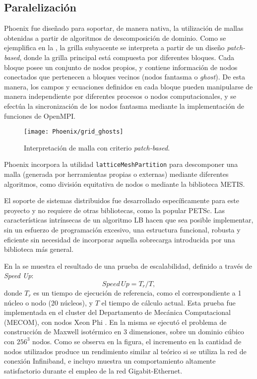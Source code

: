 \subsection{Paralelizaci\'on}

Phoenix fue dise\~nado para soportar, de manera nativa, la utilizaci\'on de mallas obtenidas a partir de algoritmos de descomposici\'on de dominio. Como se ejemplifica en la , la grilla subyacente se interpreta a partir de un dise\~no \emph{patch-based}, donde la grilla principal est\'a compuesta por diferentes bloques. Cada bloque posee un conjunto de nodos propios, y contiene informaci\'on de nodos conectados que pertenecen a bloques vecinos (nodos fantasma o \emph{ghost}). De esta manera, los campos y ecuaciones definidos en cada bloque pueden manipularse de manera independiente por diferentes procesos o nodos computacionales, y se efect\'ua la sincronizaci\'on de los nodos fantasma mediante la implementaci\'on de funciones de OpenMPI. 

\begin{figure}[ht]
	\centering
	\texttt{[image: Phoenix/grid\_ghosts]}
	\caption{Interpretaci\'on de malla con criterio \emph{patch-based}.}
	\label{fig:patch_based}
\end{figure}

Phoenix incorpora la utilidad \texttt{latticeMeshPartition} para descomponer una malla (generada por herramientas propias o externas) mediante diferentes algoritmos, como divisi\'on equitativa de nodos o mediante la biblioteca METIS.

El soporte de sistemas distribuidos fue desarrollado espec\'ificamente para este proyecto y no requiere de otras bibliotecas, como la popular PETSc. Las caracter\'isticas intr\'insecas de un algoritmo LB hacen que sea posible implementar, sin un esfuerzo de programaci\'on excesivo, una estructura funcional, robusta y eficiente sin necesidad de incorporar aquella sobrecarga introducida por una biblioteca m\'as general. 

En la  se muestra el resultado de una prueba de escalabilidad, definido a trav\'es de \emph{Speed Up}:
\begin{equation}
	Speed\,Up = T_r / T,
\end{equation}
donde $T_r$ es un tiempo de ejecuci\'on de referencia, como el correspondiente a 1 n\'ucleo o nodo (20 n\'ucleos), y $T$ el tiempo de c\'alculo actual. Esta prueba fue implementada en el cluster del Departamento de Mec\'anica Computacional (MECOM), con nodos Xeon Phi . En la misma se ejecut\'o el problema de construcci\'on de Maxwell isot\'ermico en 3 dimensiones, sobre un dominio c\'ubico con $256^3$ nodos. Como se observa en la figura, el incremento en la cantidad de nodos utilizados produce un rendimiento similar al te\'orico si se utiliza la red de conexi\'on Infiniband, e incluyo muestra un comportamiento altamente satisfactorio durante el empleo de la red Gigabit-Ethernet.

